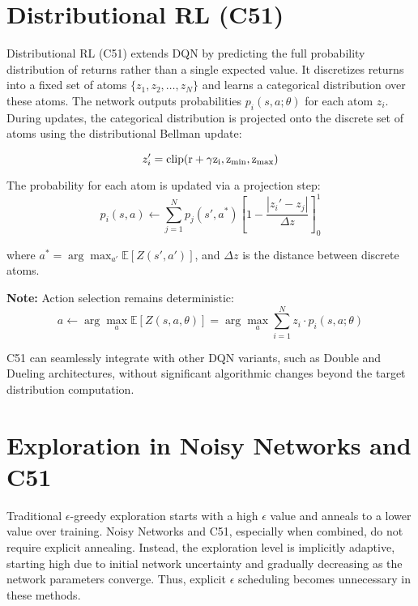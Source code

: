 \documentclass{article}
\begin{document}
\section{Distributional RL (C51)}

Distributional RL (C51) extends DQN by predicting the full probability distribution of returns rather than a single expected value. It discretizes returns into a fixed set of atoms $\{ z_1, z_2, \dots, z_N \}$ and learns a categorical distribution over these atoms. The network outputs probabilities $p_i(s,a;\theta)$ for each atom $z_i$. During updates, the categorical distribution is projected onto the discrete set of atoms using the distributional Bellman update:

\[
z_i' = \rm{clip}(r + \gamma z_i, z_{\rm{min}}, z_{\rm{max}})
\]

The probability for each atom is updated via a projection step:
\[
p_i(s,a) \leftarrow \sum_{j=1}^{N} p_j(s', a^*) \left[1 - \frac{|z_i' - z_j|}{\Delta z}\right]_0^1
\]

where $a^* = \arg\max_{a'} \mathbb{E}[Z(s', a')]$, and $\Delta z$ is the distance between discrete atoms.

\textbf{Note:} Action selection remains deterministic:
\[
a \leftarrow \arg\max_a \mathbb{E}\left[Z\left(s, a, \theta \right)\right] = \arg\max_a \sum_{i=1}^{N} z_i \cdot p_i(s, a; \theta)
\]

C51 can seamlessly integrate with other DQN variants, such as Double and Dueling architectures, without significant algorithmic changes beyond the target distribution computation.

\section{Exploration in Noisy Networks and C51}

Traditional $\epsilon$-greedy exploration starts with a high $\epsilon$ value and anneals to a lower value over training. Noisy Networks and C51, especially when combined, do not require explicit annealing. Instead, the exploration level is implicitly adaptive, starting high due to initial network uncertainty and gradually decreasing as the network parameters converge. Thus, explicit $\epsilon$ scheduling becomes unnecessary in these methods.
\end{document}
